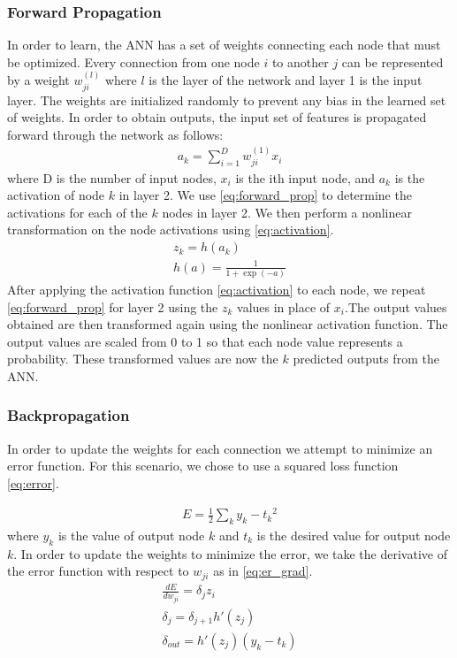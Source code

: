 \documentclass[11pt,letterpaper]{article}
\begin{document}
\subsubsection{Forward Propagation}
In order to learn, the ANN has a set of weights connecting each node that must be optimized. Every connection from one node $i$ to another $j$ can be represented by a weight $w_{ji}^{(l)}$ where $l$ is the layer of the network and layer 1 is the input layer. The weights are initialized randomly to prevent any bias in the learned set of weights. In order to obtain outputs, the input set of features is propagated forward through the network as follows:
\begin{align} \label{eq:forward_prop}
a_k = \sum_{i = 1}^{D}{w_{ji}^{(1)}x_i}
\end{align}
where D is the number of input nodes, $x_i$ is the ith input node, and $a_k$ is the activation of node $k$ in layer 2. We use \eqref{eq:forward_prop} to determine the activations for each of the $k$ nodes in layer 2. We then perform a nonlinear transformation on the node activations using \eqref{eq:activation}. 
\begin{align} \label{eq:activation}
z_k = h(a_k)\\
h(a) = \frac{1}{1+\exp{(-a)}}
\end{align}
After applying the activation function \eqref{eq:activation} to each node, we repeat \eqref{eq:forward_prop} for layer 2 using the $z_k$ values in place of $x_i$.The output values obtained are then transformed again using the nonlinear activation function. The output values are scaled from 0 to 1 so that each node value represents a probability. These transformed values are now the $k$ predicted outputs from the ANN.

\subsubsection{Backpropagation}
In order to update the weights for each connection we attempt to minimize an error function. For this scenario, we chose to use a squared loss function \eqref{eq:error}.

\begin{align} \label{eq:error}
E = \frac{1}{2}\sum_k{y_k - t_k}^2
\end{align}
where $y_k$ is the value of output node $k$ and $t_k$ is the desired value for output node $k$. In order to update the weights to minimize the error, we take the derivative of the error function with respect to $w_{ji}$ as in \eqref{eq:er_grad}.
\begin{align} 
 \label{eq:er_grad}
\frac{dE}{dw_{ji}} = \delta_j{z_i}\\
\label{eq:delta1}
\delta_j = \delta_{j+1}h'(z_j)\\
\label{eq:delta}
\delta_{out} = h'(z_j)(y_k - t_k)
\end{align}
\end{document}
